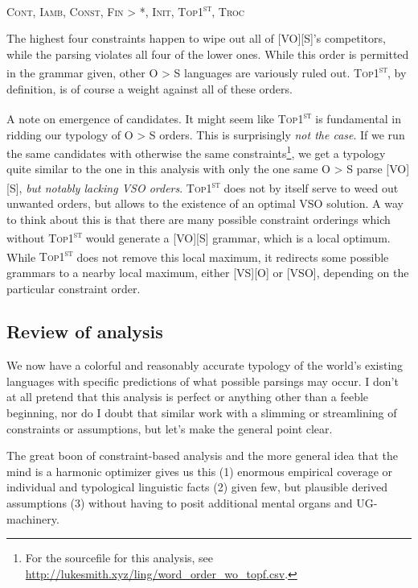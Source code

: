 \documentclass{article}
\newcommand{\cont}{\textsc{Cont}}
\newcommand{\iamb}{\textsc{Iamb}}
\newcommand{\cons}{\textsc{Const}}
\newcommand{\topf}{\textsc{Top1\textsuperscript{st}}}
\newcommand{\nophi}{\textsc{*\textphi}}
\newcommand{\finphi}{\textsc{Fin\textphi}}
\newcommand{\initphi}{\textsc{Init\textphi}}
\newcommand{\troc}{\textsc{Troc}}
\begin{document}
\begin{center}
\cont, \iamb, \cons, {\finphi} {\textgreater} \nophi, \initphi, \topf, \troc
\end{center}

The highest four constraints happen to wipe out all of [VO][S]'s competitors, while the parsing violates all four of the lower ones.
While this order is permitted in the grammar given, other O {\textgreater} S languages are variously ruled out.
{\topf}, by definition, is of course a weight against all of these orders.

A note on emergence of candidates.
It might seem like {\topf} is fundamental in ridding our typology of O {\textgreater} S orders.
This is surprisingly \emph{not the case}.
If we run the same candidates with otherwise the same constraints\footnote{For the sourcefile for this analysis, see \href{http://lukesmith.xyz/ling/word_order_wo_topf.csv}{http://lukesmith.xyz/ling/word\_order\_wo\_topf.csv}.}, we get a typology quite similar to the one in this analysis with only the one same O {\textgreater} S parse [VO][S], \emph{but notably lacking VSO orders}.
{\topf} does not by itself serve to weed out unwanted orders, but allows to the existence of an optimal VSO solution.
A way to think about this is that there are many possible constraint orderings which without {\topf} would generate a [VO][S] grammar, which is a local optimum.
While {\topf} does not remove this local maximum, it redirects some possible grammars to a nearby local maximum, either [VS][O] or [VSO], depending on the particular constraint order.

\subsection{Review of analysis}

We now have a colorful and reasonably accurate typology of the world's existing languages with specific predictions of what possible parsings may occur.
I don't at all pretend that this analysis is perfect or anything other than a feeble beginning, nor do I doubt that similar work with a slimming or streamlining of constraints or assumptions, but let's make the general point clear.

The great boon of constraint-based analysis and the more general idea that the mind is a harmonic optimizer gives us this (1) enormous empirical coverage or individual and typological linguistic facts (2) given few, but plausible derived assumptions (3) without having to posit additional mental organs and UG-machinery.
\end{document}
